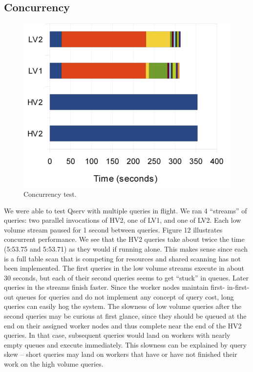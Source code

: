 \documentclass[DM,toc]{lsstdoc}
\begin{document}
\subsection{Concurrency}\label{concurrency}

\begin{figure}[H]
\centering
\includegraphics{_static/150_node_concurrency}
\caption{Concurrency test.}
\end{figure}

We were able to test Qserv with multiple queries in flight. We ran 4
``streams'' of queries: two parallel invocations of HV2, one of LV1, and
one of LV2. Each low volume stream paused for 1 second between queries.
Figure 12 illustrates concurrent performance. We see that the HV2
queries take about twice the time (5:53.75 and 5:53.71) as they would if
running alone. This makes sense since each is a full table scan that is
competing for resources and shared scanning has not been implemented.
The first queries in the low volume streams execute in about 30 seconds,
but each of their second queries seems to get ``stuck'' in queues. Later
queries in the streams finish faster. Since the worker nodes maintain
first- in-first-out queues for queries and do not implement any concept
of query cost, long queries can easily hog the system. The slowness of
low volume queries after the second queries may be curious at first
glance, since they should be queued at the end on their assigned worker
nodes and thus complete near the end of the HV2 queries. In that case,
subsequent queries would land on workers with nearly empty queues and
execute immediately. This slowness can be explained by query skew --
short queries may land on workers that have or have not finished their
work on the high volume queries.
\end{document}
